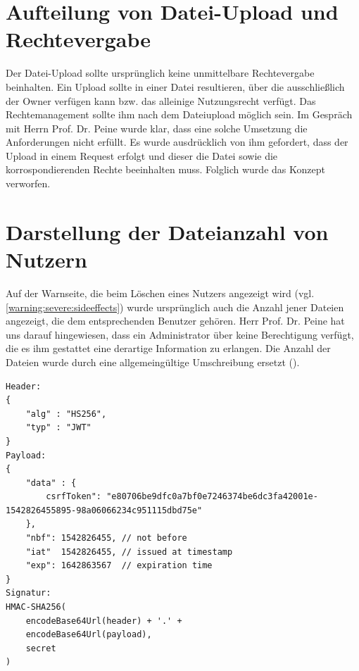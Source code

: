 \documentclass[12pt,DIV14,BCOR10mm,a4paper,parskip=half-,headsepline,headinclude,english,ngerman,bibliography=totocnumbered]{scrreprt}
\begin{document}
\section{Aufteilung von Datei-Upload und Rechtevergabe}
Der Datei-Upload sollte ursprünglich keine unmittelbare Rechtevergabe beinhalten. Ein Upload sollte in einer Datei resultieren, über die ausschließlich der Owner verfügen kann bzw. das alleinige Nutzungsrecht verfügt. Das Rechtemanagement sollte ihm nach dem Dateiupload möglich sein. Im Gespräch mit Herrn Prof. Dr. Peine wurde klar, dass eine solche Umsetzung die Anforderungen nicht erfüllt. Es wurde ausdrücklich von ihm gefordert, dass der Upload in einem Request erfolgt und dieser die Datei sowie die korrospondierenden Rechte beeinhalten muss. Folglich wurde das Konzept verworfen.

\section{Darstellung der Dateianzahl von Nutzern}
Auf der Warnseite, die beim Löschen eines Nutzers angezeigt wird (vgl. \ref{warning:severe:sideeffects}) wurde ursprünglich auch die Anzahl jener Dateien angezeigt, die dem entsprechenden Benutzer gehören. Herr Prof. Dr. Peine hat uns darauf hingewiesen, dass ein Administrator über keine Berechtigung verfügt, die es ihm gestattet eine derartige Information zu erlangen. Die Anzahl der Dateien wurde durch eine allgemeingültige Umschreibung ersetzt ().


\printbibliography

\printacronyms[title=Abkürzungsverzeichnis,toctitle=Abkürzungsverzeichnis]
\printglossary[title=Glossar,toctitle=Glossar,type=main]

\iftotalfigures
  \listoffigures
\fi


\begin{appendices}

\begin{lstlisting}[label=jwtformat, caption={Aufbau eines JSON Web Token},captionpos=b]
Header:
{
	"alg" : "HS256",
	"typ" : "JWT"
}
Payload:
{
	"data" : {
		csrfToken": "e80706be9dfc0a7bf0e7246374be6dc3fa42001e-1542826455895-98a06066234c951115dbd75e"
	},
	"nbf": 1542826455, // not before
	"iat"  1542826455, // issued at timestamp
	"exp": 1642863567  // expiration time
}
Signatur:
HMAC-SHA256(
	encodeBase64Url(header) + '.' +
	encodeBase64Url(payload),
	secret
)
\end{lstlisting}

\end{appendices}
\end{document}
